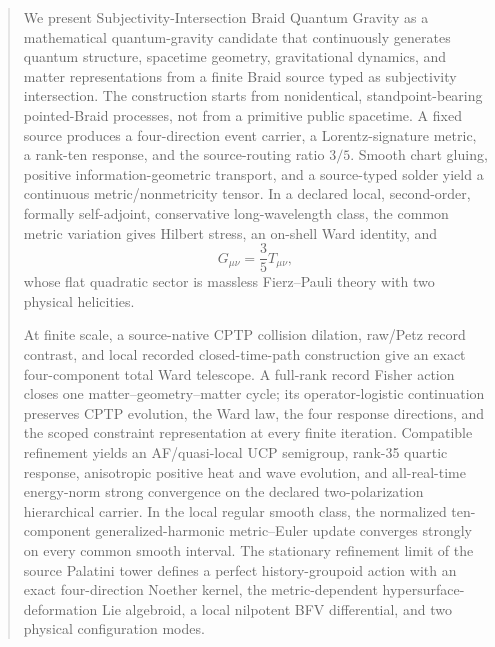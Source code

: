 \documentclass[11pt]{article}
\theoremstyle{definition}
\theoremstyle{remark}
\begin{document}
\begin{abstract}
We present Subjectivity-Intersection Braid Quantum Gravity as a mathematical quantum-gravity candidate that continuously generates quantum structure, spacetime geometry, gravitational dynamics, and matter representations from a finite Braid source typed as subjectivity intersection. The construction starts from nonidentical, standpoint-bearing pointed-Braid processes, not from a primitive public spacetime. A fixed source produces a four-direction event carrier, a Lorentz-signature metric, a rank-ten response, and the source-routing ratio $3/5$. Smooth chart gluing, positive information-geometric transport, and a source-typed solder yield a continuous metric/nonmetricity tensor. In a declared local, second-order, formally self-adjoint, conservative long-wavelength class, the common metric variation gives Hilbert stress, an on-shell Ward identity, and
\[
G_{\mu\nu}=\frac35T_{\mu\nu},
\]
whose flat quadratic sector is massless Fierz--Pauli theory with two physical helicities.

At finite scale, a source-native CPTP collision dilation, raw/Petz record contrast, and local recorded closed-time-path construction give an exact four-component total Ward telescope. A full-rank record Fisher action closes one matter--geometry--matter cycle; its operator-logistic continuation preserves CPTP evolution, the Ward law, the four response directions, and the scoped constraint representation at every finite iteration. Compatible refinement yields an AF/quasi-local UCP semigroup, rank-35 quartic response, anisotropic positive heat and wave evolution, and all-real-time energy-norm strong convergence on the declared two-polarization hierarchical carrier. In the local regular smooth class, the normalized ten-component generalized-harmonic metric--Euler update converges strongly on every common smooth interval. The stationary refinement limit of the source Palatini tower defines a perfect history-groupoid action with an exact four-direction Noether kernel, the metric-dependent hypersurface-deformation Lie algebroid, a local nilpotent BFV differential, and two physical configuration modes.


\end{abstract}
\end{document}
